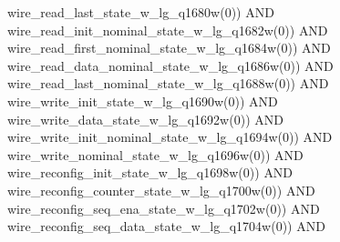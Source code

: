 \begin{DoxyCode}
{{      wire_read_last_state_w_lg_q1680w}\textcolor{vhdlchar}{(}\textcolor{vhdllogic}{}\textcolor{vhdllogic}{0}\textcolor{vhdlchar}{)}\textcolor{vhdlchar}{)} \textcolor{keywordflow}{AND} \textcolor{vhdlchar}{
      wire_read_init_nominal_state_w_lg_q1682w}\textcolor{vhdlchar}{(}\textcolor{vhdllogic}{}\textcolor{vhdllogic}{0}\textcolor{vhdlchar}{)}\textcolor{vhdlchar}{)} \textcolor{keywordflow}{AND} \textcolor{vhdlchar}{
      wire_read_first_nominal_state_w_lg_q1684w}\textcolor{vhdlchar}{(}\textcolor{vhdllogic}{}\textcolor{vhdllogic}{0}\textcolor{vhdlchar}{)}\textcolor{vhdlchar}{)} \textcolor{keywordflow}{AND} \textcolor{vhdlchar}{
      wire_read_data_nominal_state_w_lg_q1686w}\textcolor{vhdlchar}{(}\textcolor{vhdllogic}{}\textcolor{vhdllogic}{0}\textcolor{vhdlchar}{)}\textcolor{vhdlchar}{)} \textcolor{keywordflow}{AND} \textcolor{vhdlchar}{
      wire_read_last_nominal_state_w_lg_q1688w}\textcolor{vhdlchar}{(}\textcolor{vhdllogic}{}\textcolor{vhdllogic}{0}\textcolor{vhdlchar}{)}\textcolor{vhdlchar}{)} \textcolor{keywordflow}{AND} \textcolor{vhdlchar}{
      wire_write_init_state_w_lg_q1690w}\textcolor{vhdlchar}{(}\textcolor{vhdllogic}{}\textcolor{vhdllogic}{0}\textcolor{vhdlchar}{)}\textcolor{vhdlchar}{)} \textcolor{keywordflow}{AND} \textcolor{vhdlchar}{wire_write_data_state_w_lg_q1692w}\textcolor{vhdlchar}{(}\textcolor{vhdllogic}{}\textcolor{vhdllogic}{0}\textcolor{vhdlchar}{)}\textcolor{vhdlchar}{)} \textcolor{keywordflow}{AND} \textcolor{vhdlchar}{
      wire_write_init_nominal_state_w_lg_q1694w}\textcolor{vhdlchar}{(}\textcolor{vhdllogic}{}\textcolor{vhdllogic}{0}\textcolor{vhdlchar}{)}\textcolor{vhdlchar}{)} \textcolor{keywordflow}{AND} \textcolor{vhdlchar}{
      wire_write_nominal_state_w_lg_q1696w}\textcolor{vhdlchar}{(}\textcolor{vhdllogic}{}\textcolor{vhdllogic}{0}\textcolor{vhdlchar}{)}\textcolor{vhdlchar}{)} \textcolor{keywordflow}{AND} \textcolor{vhdlchar}{
      wire_reconfig_init_state_w_lg_q1698w}\textcolor{vhdlchar}{(}\textcolor{vhdllogic}{}\textcolor{vhdllogic}{0}\textcolor{vhdlchar}{)}\textcolor{vhdlchar}{)} \textcolor{keywordflow}{AND} \textcolor{vhdlchar}{
      wire_reconfig_counter_state_w_lg_q1700w}\textcolor{vhdlchar}{(}\textcolor{vhdllogic}{}\textcolor{vhdllogic}{0}\textcolor{vhdlchar}{)}\textcolor{vhdlchar}{)} \textcolor{keywordflow}{AND} \textcolor{vhdlchar}{
      wire_reconfig_seq_ena_state_w_lg_q1702w}\textcolor{vhdlchar}{(}\textcolor{vhdllogic}{}\textcolor{vhdllogic}{0}\textcolor{vhdlchar}{)}\textcolor{vhdlchar}{)} \textcolor{keywordflow}{AND} \textcolor{vhdlchar}{
      wire_reconfig_seq_data_state_w_lg_q1704w}\textcolor{vhdlchar}{(}\textcolor{vhdllogic}{}\textcolor{vhdllogic}{0}\textcolor{vhdlchar}{)}\textcolor{vhdlchar}{)} \textcolor{keywordflow}{AND} \textcolor{vhdlchar}{
}}
\end{DoxyCode}
